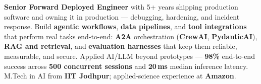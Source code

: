 \documentclass[letter,10pt]{article}
\begin{document}

\textbf{Senior Forward Deployed Engineer} with 5+ years shipping production software and owning it in production --- debugging, hardening, and incident response.
Build \textbf{agentic workflows}, \textbf{data pipelines}, and \textbf{tool integrations} that perform real tasks end-to-end: \textbf{A2A} orchestration (\textbf{CrewAI}, \textbf{PydanticAI}), \textbf{RAG and retrieval}, and \textbf{evaluation harnesses} that keep them reliable, measurable, and secure.
Applied AI/LLM beyond prototypes --- \textbf{98\%} end-to-end success across \textbf{500 concurrent sessions} and \textbf{20\,ms} median inference latency.
M.Tech in AI from \textbf{IIT Jodhpur}; applied-science experience at \textbf{Amazon}.
\end{document}

